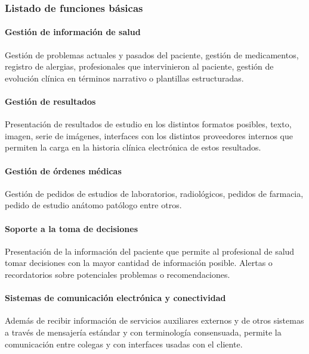 \subsubsection{Listado de funciones básicas}

\paragraph{Gestión de información de salud}

Gestión de problemas actuales y pasados del paciente, gestión de medicamentos, registro de alergias, profesionales que intervinieron al paciente, gestión de evolución clínica en términos narrativo o plantillas estructuradas.

\paragraph{Gestión de resultados}

Presentación de resultados de estudio en los distintos formatos posibles, texto, imagen, serie de imágenes, interfaces con los distintos proveedores internos que permiten la carga en la historia clínica electrónica de estos resultados.

\paragraph{Gestión de órdenes médicas}

Gestión de pedidos de estudios de laboratorios, radiológicos, pedidos de farmacia, pedido de estudio anátomo patólogo entre otros. 

\paragraph{Soporte a la toma de decisiones}

Presentación de la información del paciente que permite al profesional de salud tomar decisiones con la mayor cantidad de información posible. Alertas o recordatorios sobre potenciales problemas o recomendaciones.

\paragraph{Sistemas de comunicación electrónica y conectividad}

Además de recibir información de servicios auxiliares externos y de otros sistemas a través de mensajería estándar y con terminología consensuada, permite la comunicación entre colegas y con interfaces usadas con el cliente.

